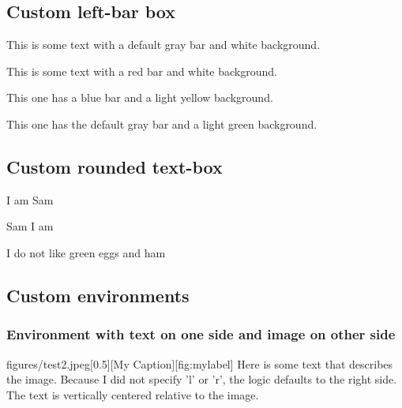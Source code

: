 \subsection{Custom left-bar box}

\begin{barbox}
This is some text with a default gray bar and white background.
\end{barbox}

\begin{barbox}[red]
This is some text with a red bar and white background.
\end{barbox}

\begin{barbox}[blue][yellow!20]
This one has a blue bar and a light yellow background.
\end{barbox}

\begin{barbox}[][green!10]
This one has the default gray bar and a light green background.
\end{barbox}

\subsection{Custom rounded text-box}

\begin{roundbox}
I am Sam
\end{roundbox}

\begin{roundbox}[yellow!20] %
Sam I am
\end{roundbox}

\begin{roundbox}[green!10][blue] %
I do not like green eggs and ham
\end{roundbox}

\newpage
\subsection{Custom environments}

\subsubsection{Environment with text on one side and image on other side}

\begin{sidebyimage}{figures/test2.jpeg}[0.5\textwidth][My Caption][fig:mylabel]
    Here is some text that describes the image. Because I did not specify 'l' or 'r', 
    the logic defaults to the right side. The text is vertically centered relative 
    to the image.
\end{sidebyimage}


